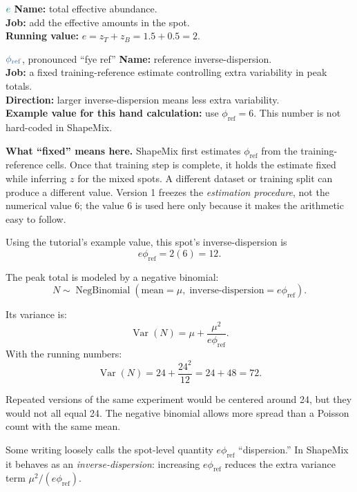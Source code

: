 \documentclass[11pt]{article}
\newcommand{\NB}{\operatorname{NegBinomial}}
\newcommand{\Var}{\operatorname{Var}}
\newcommand{\fixedq}[1]{\textcolor{fixedblue!75!black}{#1}}
\newcommand{\calcq}[1]{\textcolor{calcteal!85!black}{#1}}
\begin{document}
\begin{newvar}{\(\calcq{e}\)}
\textbf{Name:} total effective abundance.\\
\textbf{Job:} add the effective amounts in the spot.\\
\textbf{Running value:} \(e=z_T+z_B=1.5+0.5=2\).
\end{newvar}

\begin{newvar}{\(\fixedq{\phi_{\mathrm{ref}}}\), pronounced “fye ref”}
\textbf{Name:} reference inverse-dispersion.\\
\textbf{Job:} a fixed training-reference estimate controlling extra variability
in peak totals.\\
\textbf{Direction:} larger inverse-dispersion means less extra variability.\\
\textbf{Example value for this hand calculation:}
use \(\phi_{\mathrm{ref}}=6\). This number is not hard-coded in ShapeMix.
\end{newvar}

\begin{bigidea}
\textbf{What “fixed” means here.} ShapeMix first estimates
\(\phi_{\mathrm{ref}}\) from the training-reference cells. Once that training
step is complete, it holds the estimate fixed while inferring \(z\) for the
mixed spots. A different dataset or training split can produce a different
value. Version 1 freezes the \emph{estimation procedure}, not the numerical value
6; the value 6 is used here only because it makes the arithmetic easy to follow.
\end{bigidea}

Using the tutorial's example value, this spot's inverse-dispersion is
\[
e\phi_{\mathrm{ref}}=2(6)=12.
\]

The peak total is modeled by a negative binomial:
\[
\boxed{
N\sim\NB\!\left(
\text{mean}=\mu,\;
\text{inverse-dispersion}=e\phi_{\mathrm{ref}}
\right).
}
\]

Its variance is:
\[
\Var(N)=\mu+\frac{\mu^2}{e\phi_{\mathrm{ref}}}.
\]
With the running numbers:
\[
\Var(N)=24+\frac{24^2}{12}=24+48=72.
\]

\begin{translation}
Repeated versions of the same experiment would be centered around 24, but they
would not all equal 24. The negative binomial allows more spread than a Poisson
count with the same mean.
\end{translation}

\begin{watchout}
Some writing loosely calls the spot-level quantity
\(e\phi_{\mathrm{ref}}\) “dispersion.” In ShapeMix it behaves as an
\emph{inverse-dispersion}: increasing \(e\phi_{\mathrm{ref}}\) reduces the extra
variance term \(\mu^2/(e\phi_{\mathrm{ref}})\).
\end{watchout}
\end{document}
